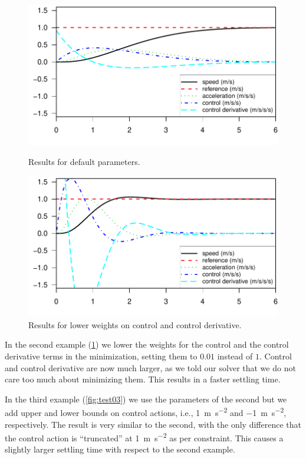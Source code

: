 \documentclass[10pt,a4paper]{article}
\def\pwidth{0.49}
\begin{document}
\begin{figure}[h]
    \centering
    \begin{minipage}[t]{\pwidth\textwidth}
        \includegraphics[width=\textwidth]{./fig/test01}
        \caption{Results for default parameters.}
        \label{fig:test01}
    \end{minipage}
    \hfill
    \begin{minipage}[t]{\pwidth\textwidth}
        \includegraphics[width=\textwidth]{./fig/test02}
        \caption{Results for lower weights on control and control derivative.}
        \label{fig:test02}
    \end{minipage}
\end{figure}

In the second example (\cref{fig:test02}) we lower the weights for the control and the control derivative terms in the minimization, setting them to $0.01$ instead of $1$.
Control and control derivative are now much larger, as we told our solver that we do not care too much about minimizing them.
This results in a faster settling time.

In the third example (\cref{fig:test03}) we use the parameters of the second but we add upper and lower bounds on control actions, i.e., \SI{1}{\meter\per\second\squared} and \SI{-1}{\meter\per\second\squared}, respectively.
The result is very similar to the second, with the only difference that the control action is ``truncated'' at \SI{1}{\meter\per\second\squared} as per constraint.
This causes a slightly larger settling time with respect to the second example.
\end{document}
